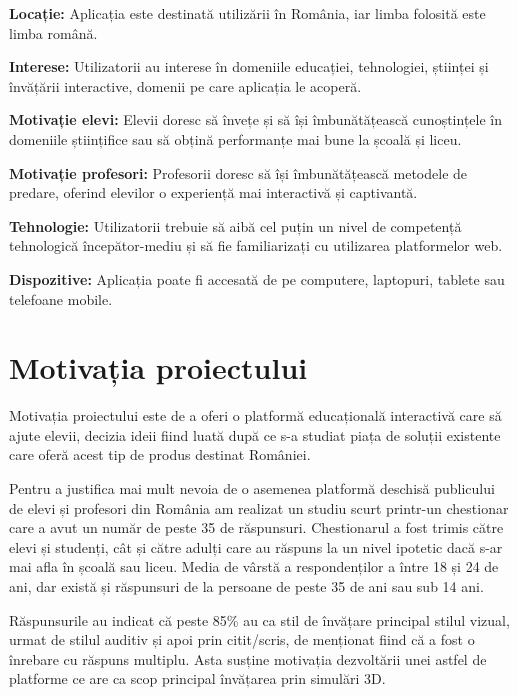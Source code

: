 \textbf{Locație:} Aplicația este destinată utilizării în România, iar limba folosită este limba română.

\textbf{Interese:} Utilizatorii au interese în domeniile educației, tehnologiei, științei și învățării interactive, domenii pe care aplicația le acoperă.

\textbf{Motivație elevi:} Elevii doresc să învețe și să își îmbunătățească cunoștințele în domeniile științifice sau să obțină performanțe mai bune la școală și liceu.

\textbf{Motivație profesori:} Profesorii doresc să își îmbunătățească metodele de predare, oferind elevilor o experiență mai interactivă și captivantă.

\textbf{Tehnologie:} Utilizatorii trebuie să aibă cel puțin un nivel de competență tehnologică începător-mediu și să fie familiarizați cu utilizarea platformelor web.

\textbf{Dispozitive:} Aplicația poate fi accesată de pe computere, laptopuri, tablete sau telefoane mobile.

\section{Motivația proiectului}
\label{sec:proj-motivation}

Motivația proiectului este de a oferi o platformă educațională interactivă care să ajute elevii, decizia ideii fiind luată după ce s-a studiat
piața de soluții existente care oferă acest tip de produs destinat României.

Pentru a justifica mai mult nevoia de o asemenea platformă deschisă publicului de elevi și profesori din România am realizat un studiu scurt
printr-un chestionar care a avut un număr de peste 35 de răspunsuri. Chestionarul a fost trimis către elevi și studenți, cât și către adulți
care au răspuns la un nivel ipotetic dacă s-ar mai afla în școală sau liceu. Media de vârstă a respondenților a între 18 și 24 de ani, dar
există și răspunsuri de la persoane de peste 35 de ani sau sub 14 ani.


Răspunsurile au indicat că peste 85\% au ca stil de învățare principal stilul vizual, urmat de stilul auditiv și
apoi prin citit/scris, de menționat fiind că a fost o înrebare cu răspuns multiplu. Asta susține motivația dezvoltării 
unei astfel de platforme ce are ca scop principal învățarea prin simulări 3D.


